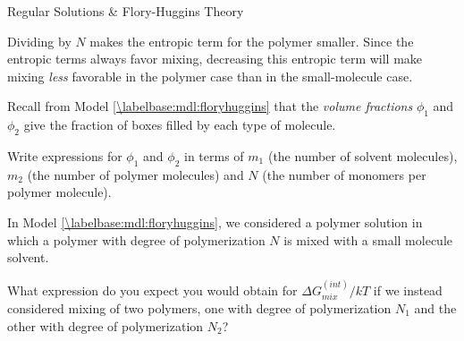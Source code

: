 \begin{activity}{Regular Solutions \& Flory-Huggins Theory}
\begin{ctqs}
\begin{solution}[2in]
				Dividing by $N$ makes the entropic term for the polymer smaller.  Since the entropic terms always favor mixing, decreasing this entropic term will make mixing \emph{less} favorable in the polymer case than in the small-molecule case.
			
			\end{solution}
			
\end{ctqs}

\begin{exercises}
			
		\exercise Recall from Model \ref{\labelbase:mdl:floryhuggins} that the \emph{volume fractions} $\phi_1$ and $\phi_2$ give the fraction of boxes filled by each type of molecule.
		
		Write expressions for $\phi_1$ and $\phi_2$ in terms of $m_1$ (the number of solvent molecules), $m_2$ (the number of polymer molecules) and $N$ (the number of monomers per polymer molecule).
				
					\begin{solution}\end{solution}
			
		\exercise In Model \ref{\labelbase:mdl:floryhuggins}, we considered a polymer solution in which a polymer with degree of polymerization $N$ is mixed with a small molecule solvent.
		
			What expression do you expect you would obtain for $\Delta G_{mix}^{(int)}/kT$ if we instead considered mixing of two polymers, one with degree of polymerization $N_1$ and the other with degree of polymerization $N_2$?
				
					\begin{solution}
\end{solution}
\end{exercises}
\end{activity}
